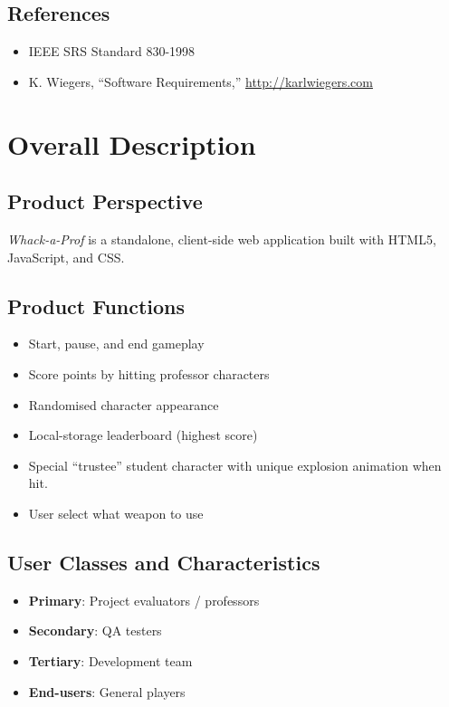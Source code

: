 \documentclass[11pt]{scrreprt}
\newcommand*{\product}{\textit{Whack-a-Prof}\xspace}
\begin{document}
\section{References}
\begin{itemize}
  \item IEEE SRS Standard 830-1998
  \item K. Wiegers, “Software Requirements,” \url{http://karlwiegers.com}
\end{itemize}

\chapter{Overall Description}

\section{Product Perspective}
\product is a standalone, client-side web application built with HTML5, JavaScript, and CSS.

\section{Product Functions}
\begin{itemize}
  \item Start, pause, and end gameplay
  \item Score points by hitting professor characters
  \item Randomised character appearance
  \item Local-storage leaderboard (highest score)
  \item Special “trustee” student character with unique explosion animation when hit.
  \item User select what weapon to use
\end{itemize}

\section{User Classes and Characteristics}
\begin{itemize}
  \item \textbf{Primary}: Project evaluators / professors
  \item \textbf{Secondary}: QA testers
  \item \textbf{Tertiary}: Development team
  \item \textbf{End-users}: General players
\end{itemize}
\end{document}
